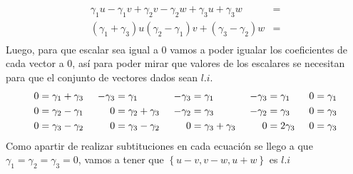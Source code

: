 \begin{enumerate}[label=\listAlph]
\[\begin{aligned}
                    \gamma_1 u - \gamma_1 v + \gamma_2 v - \gamma_2 w + \gamma_3 u + \gamma_3 w &= \\
                    (\gamma_1 + \gamma_3) u (\gamma_2 - \gamma_1)v + (\gamma_3 - \gamma_2) w &= \\
                \end{aligned}
            \]
            Luego, para que escalar sea igual a 0 vamos a poder igualar los coeficientes de cada vector a 0, así para poder mirar que valores de 
            los escalares se necesitan para que el conjunto de vectores dados sean \(l.i\).
            \[
                \begin{aligned}
                    0 &= \gamma_1 + \gamma_3 \\
                    0 &= \gamma_2 - \gamma_1 \\
                    0 &= \gamma_3 - \gamma_2 \\
                \end{aligned}
                \hspace{0.5cm}
                \begin{aligned}
                    -\gamma_3 &= \gamma_1 \\
                    0 &= \gamma_2 + \gamma_3 \\
                    0 &= \gamma_3 - \gamma_2 \\
                \end{aligned}
                \hspace{0.5cm}
                \begin{aligned}
                    -\gamma_3 &= \gamma_1 \\
                    -\gamma_2 &= \gamma_3 \\
                    0 &= \gamma_3 + \gamma_3 \\
                \end{aligned}
                \hspace{0.5cm}
                \begin{aligned}
                    -\gamma_3 &= \gamma_1 \\
                    -\gamma_2 &= \gamma_3 \\
                    0 &= 2\gamma_3 \\
                \end{aligned}
                \hspace{0.5cm}
                \begin{aligned}
                    0 &= \gamma_1 \\
                    0 &= \gamma_3 \\
                    0 &= \gamma_3 \\
                \end{aligned}
            \]
            Como apartir de realizar subtituciones en cada ecuación se llego a que \(\gamma_1 = \gamma_2 = \gamma_3 = 0\), 
            vamos a tener que \(\left\{u - v, v - w, u + w\right\}\) es \(l.i\)
    \end{enumerate}

